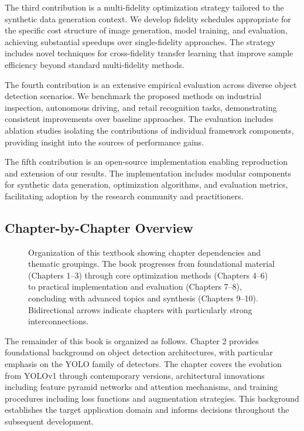 The third contribution is a multi-fidelity optimization strategy tailored to the synthetic data generation context. We develop fidelity schedules appropriate for the specific cost structure of image generation, model training, and evaluation, achieving substantial speedups over single-fidelity approaches. The strategy includes novel techniques for cross-fidelity transfer learning that improve sample efficiency beyond standard multi-fidelity methods.

The fourth contribution is an extensive empirical evaluation across diverse object detection scenarios. We benchmark the proposed methods on industrial inspection, autonomous driving, and retail recognition tasks, demonstrating consistent improvements over baseline approaches. The evaluation includes ablation studies isolating the contributions of individual framework components, providing insight into the sources of performance gains.

The fifth contribution is an open-source implementation enabling reproduction and extension of our results. The implementation includes modular components for synthetic data generation, optimization algorithms, and evaluation metrics, facilitating adoption by the research community and practitioners.

\subsection{Chapter-by-Chapter Overview}
\label{subsec:chapter_overview}

\begin{figure}[t]
\centering
\resizebox{0.9\textwidth}{!}{}
\caption{Organization of this textbook showing chapter dependencies and thematic groupings. The book progresses from foundational material (Chapters 1--3) through core optimization methods (Chapters 4--6) to practical implementation and evaluation (Chapters 7--8), concluding with advanced topics and synthesis (Chapters 9--10). Bidirectional arrows indicate chapters with particularly strong interconnections.}
\label{fig:book_roadmap}
\end{figure}

The remainder of this book is organized as follows. Chapter 2 provides foundational background on object detection architectures, with particular emphasis on the YOLO family of detectors. The chapter covers the evolution from YOLOv1 through contemporary versions, architectural innovations including feature pyramid networks and attention mechanisms, and training procedures including loss functions and augmentation strategies. This background establishes the target application domain and informs decisions throughout the subsequent development.


